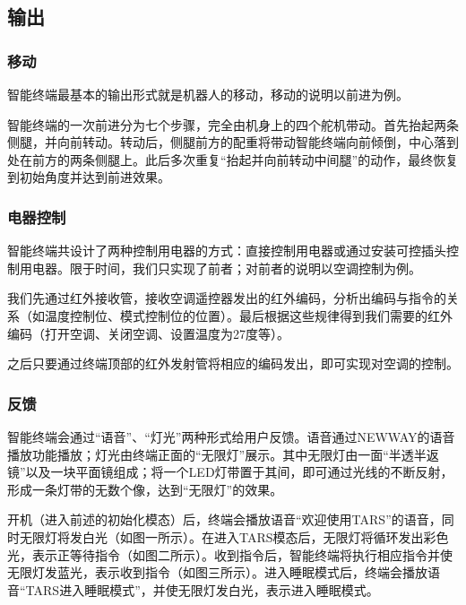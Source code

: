     \subsection{输出}
    \subsubsection{移动}
    \hspace{1.5em}智能终端最基本的输出形式就是机器人的移动，移动的说明以前进为例。
    
    \hspace{1.5em}智能终端的一次前进分为七个步骤，完全由机身上的四个舵机带动。首先抬起两条侧腿，并向前转动。转动后，侧腿前方的配重将带动智能终端向前倾倒，中心落到处在前方的两条侧腿上。此后多次重复“抬起并向前转动中间腿”的动作，最终恢复到初始角度并达到前进效果。

    \subsubsection{电器控制}
    \hspace{1.5em}智能终端共设计了两种控制用电器的方式：直接控制用电器或通过安装可控插头控制用电器。限于时间，我们只实现了前者；对前者的说明以空调控制为例。

    \hspace{1.5em}我们先通过红外接收管，接收空调遥控器发出的红外编码，分析出编码与指令的关系（如温度控制位、模式控制位的位置）。最后根据这些规律得到我们需要的红外编码（打开空调、关闭空调、设置温度为27度等）。

    \hspace{1.5em}之后只要通过终端顶部的红外发射管将相应的编码发出，即可实现对空调的控制。

    \subsubsection{反馈}
    \hspace{1.5em}智能终端会通过“语音”、“灯光”两种形式给用户反馈。语音通过NEWWAY的语音播放功能播放；灯光由终端正面的“无限灯”展示。其中无限灯由一面“半透半返镜”以及一块平面镜组成；将一个LED灯带置于其间，即可通过光线的不断反射，形成一条灯带的无数个像，达到“无限灯”的效果。
    
    \hspace{1.5em}开机（进入前述的初始化模态）后，终端会播放语音“欢迎使用TARS”的语音，同时无限灯将发白光（如图一所示）。在进入TARS模态后，无限灯将循环发出彩色光，表示正等待指令（如图二所示）。收到指令后，智能终端将执行相应指令并使无限灯发蓝光，表示收到指令（如图三所示）。进入睡眠模式后，终端会播放语音“TARS进入睡眠模式”，并使无限灯发白光，表示进入睡眠模式。

